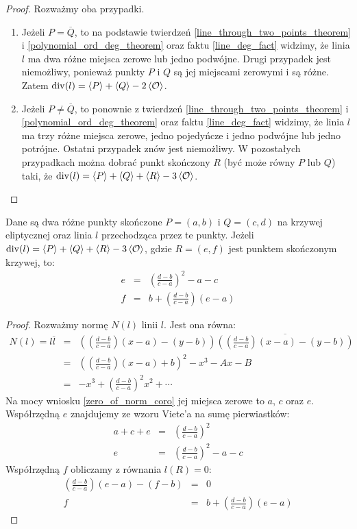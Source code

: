 \begin{proof}
Rozważmy oba przypadki.
\begin{enumerate}
\item
Jeżeli $P = \overline{Q}$,
to na podstawie twierdzeń
\ref{line_through_two_points_theorem} i \ref{polynomial_ord_deg_theorem}
oraz faktu \ref{line_deg_fact} widzimy,
że linia $l$ ma dwa różne miejsca zerowe lub jedno podwójne.
Drugi przypadek jest niemożliwy,
ponieważ punkty $P$ i $Q$ są jej miejscami zerowymi i są różne.
Zatem $\operatorname{div}(l) = \left\langle P\right\rangle + \left\langle Q\right\rangle - 2\left\langle\mathcal{O}\right\rangle$.
\item
Jeżeli $P \neq \overline{Q}$,
to ponownie z twierdzeń
\ref{line_through_two_points_theorem} i \ref{polynomial_ord_deg_theorem}
oraz faktu \ref{line_deg_fact} widzimy,
że linia $l$ ma trzy różne miejsca zerowe, jedno pojedyńcze i jedno podwójne
lub jedno potrójne.
Ostatni przypadek znów jest niemożliwy.
W pozostałych przypadkach można dobrać punkt skończony $R$
(być może równy $P$ lub $Q$) taki,
że $\operatorname{div}(l) = \left\langle P\right\rangle + \left\langle Q\right\rangle + \left\langle R\right\rangle - 3\left\langle\mathcal{O}\right\rangle$.
\end{enumerate}
\end{proof}

\begin{theorem}
Dane są dwa różne punkty skończone $P = (a, b)$ i $Q = (c, d)$
na krzywej eliptycznej oraz linia $l$ przechodząca przez te punkty.
Jeżeli $\operatorname{div}(l) = \left\langle P\right\rangle + \left\langle Q\right\rangle + \left\langle R\right\rangle - 3\left\langle\mathcal{O}\right\rangle$,
gdzie $R = (e, f)$ jest punktem skończonym krzywej,
to:
\begin{eqnarray}
\label{chord_line_third_point_x_eqn}
e & = & \left(\frac{d-b}{c-a}\right)^2 - a - c \\
\label{chord_line_third_point_y_eqn}
f & = & b + \left(\frac{d-b}{c-a}\right)(e-a)
\end{eqnarray}
\end{theorem}

\begin{proof}
Rozważmy normę $N(l)$ linii $l$. Jest ona równa:
\begin{eqnarray*}
N(l) = l\overline{l}
& = & \left(\left(\frac{d-b}{c-a}\right)(x - a) - (y - b)\right)
      \overline{\left(\left(\frac{d-b}{c-a}\right)(x - a) - (y - b)\right)} \\
& = & \left(\left(\frac{d-b}{c-a}\right)(x-a) + b\right)^2 - x^3 - Ax - B \\
& = & -x^3 + \left(\frac{d-b}{c-a}\right)^2x^2 + \cdots
\end{eqnarray*}
Na mocy wniosku \ref{zero_of_norm_coro}
jej miejsca zerowe to $a$, $c$ oraz $e$.
Współrzędną $e$ znajdujemy ze wzoru Viete'a na sumę pierwiastków:
\begin{eqnarray*}
a + c + e & = & \left(\frac{d-b}{c-a}\right)^2 \\
        e & = & \left(\frac{d-b}{c-a}\right)^2 - a - c
\end{eqnarray*}
Współrzędną $f$ obliczamy z równania $l(R) = 0$:
\begin{eqnarray*}
\left(\frac{d-b}{c-a}\right)(e - a) - (f - b) & = & 0 \\
f & = & b + \left(\frac{d-b}{c-a}\right)(e-a)
\end{eqnarray*}
\end{proof}

